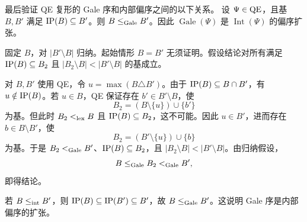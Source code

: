 最后验证 QE 复形的 Gale 序和内部偏序之间的以下关系。
设 $\Psi\in\mathrm{QE}$，且基 $B,B'$ 满足 $\operatorname{IP}(B)\subseteq B'$。则 $B\le_{\mathrm{Gale}}B'$。因此 $\operatorname{Gale}(\Psi)$ 是 $\operatorname{Int}(\Psi)$ 的偏序扩张。
\begin{proofcn}
固定 $B$，对 $|B'\setminus B|$ 归纳。起始情形 $B=B'$ 无须证明。假设结论对所有满足 $\operatorname{IP}(B)\subseteq B_2$ 且 $|B_2\setminus B|<|B'\setminus B|$ 的基成立。

对 $B,B'$ 使用 QE，令 $u=\max(B\triangle B')$。由于 $\operatorname{IP}(B)\subseteq B\cap B'$，有 $u\notin\operatorname{IP}(B)$。若 $u\in B$，QE 保证存在 $b'\in B'\setminus B$，使
\[
B_2=(B\setminus\{u\})\cup\{b'\}
\]
为基。但此时 $B_2<_{\mathrm{lex}}B$ 且 $\operatorname{IP}(B)\subseteq B_2$，这不可能。因此 $u\in B'$，进而存在 $b\in B\setminus B'$，使
\[
B_2=(B'\setminus\{u\})\cup\{b\}
\]
为基。于是 $B_2<_{\mathrm{Gale}}B'$、$\operatorname{IP}(B)\subseteq B_2$，且 $|B_2\setminus B|<|B'\setminus B|$。由归纳假设，
\[
B\le_{\mathrm{Gale}}B_2<_{\mathrm{Gale}}B',
\]
即得结论。

若 $B\le_{\rm int}B'$，则 $\operatorname{IP}(B)\subseteq\operatorname{IP}(B')\subseteq B'$，故 $B\le_{\mathrm{Gale}}B'$。这说明 Gale 序是内部偏序的扩张。
\end{proofcn}
